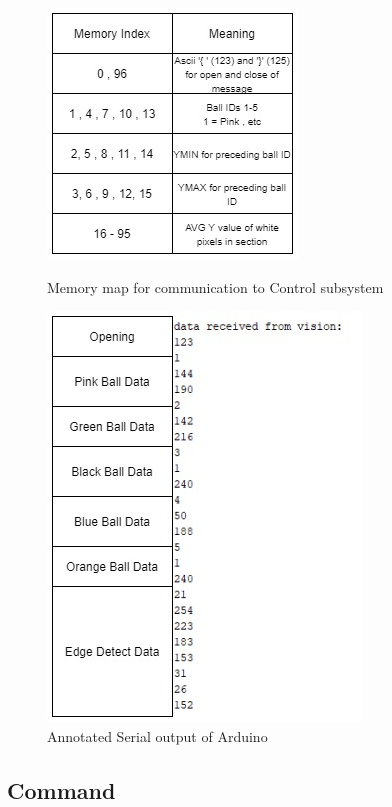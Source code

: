 \documentclass[10pt,twoside]{article}
\begin{document}
\begin{figure}[hbt!]
  \begin{minipage}[b]{0.44\textwidth}
    \centering
    \includegraphics[scale = 0.5]{memoryMap.jpg}
    \caption{Memory map for communication to Control subsystem}
    \label{fig:mem_Map}
  \end{minipage}
  \hfill
  \begin{minipage}[b]{0.44\textwidth}
    \includegraphics[scale = 0.35]{Serial.jpg}
    \caption{Annotated Serial output of Arduino}
    \label{fig:SerialOut}
  \end{minipage}
\end{figure}

\subsection{Command}
\end{document}
